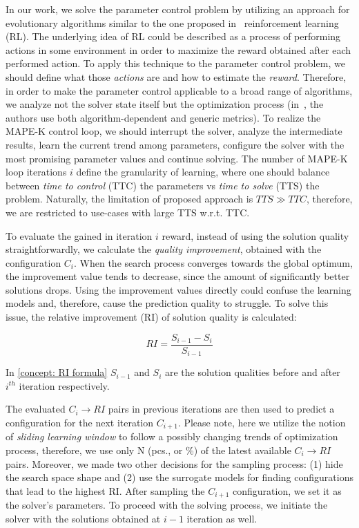 In our work, we solve the parameter control problem by utilizing an approach for evolutionary algorithms similar to the one proposed in~\cite{karafotias2014generic} reinforcement learning (RL). The underlying idea of RL could be described as a process of performing actions in some environment in order to maximize the reward obtained after each performed action. To apply this technique to the parameter control problem, we should define what those \emph{actions} are and how to estimate the \emph{reward}. Therefore, in order to make the parameter control applicable to a broad range of algorithms, we analyze not the solver state itself but the optimization process (in~\cite{karafotias2014generic}, the authors use both algorithm-dependent and generic metrics). To realize the MAPE-K control loop, we should interrupt the solver, analyze the intermediate results, learn the current trend among parameters, configure the solver with the most promising parameter values and continue solving. The number of MAPE-K loop iterations $i$ define the granularity of learning, where one should balance between \emph{time to control} (TTC) the parameters vs \emph{time to solve} (TTS) the problem. Naturally, the limitation of proposed approach is $TTS \gg TTC$, therefore, we are restricted to use-cases with large TTS w.r.t. TTC.

To evaluate the gained in iteration $i$ reward, instead of using the solution quality straightforwardly, we calculate the \emph{quality improvement}, obtained with the configuration $C_i$. When the search process converges towards the global optimum, the improvement value tends to decrease, since the amount of significantly better solutions drops. Using the improvement values directly could confuse the learning models and, therefore, cause the prediction quality to struggle. To solve this issue, the relative improvement (RI) of solution quality is calculated: 

\begin{equation}
RI = \frac{S_{i-1} - S_{i}}{S_{i-1}}
\label{concept: RI formula}
\end{equation}

In \cref{concept: RI formula} $S_{i-1}$ and $S_i$ are the solution qualities before and after $i^{th}$ iteration respectively.

The evaluated $C_i \rightarrow RI$ pairs in previous iterations are then used to predict a configuration for the next iteration $C_{i+1}$. Please note, here we utilize the notion of \emph{sliding learning window} to follow a possibly changing trends of optimization process, therefore, we use only N (pcs., or \%) of the latest available $C_i \rightarrow RI$ pairs. Moreover, we made two other decisions for the sampling process: (1) hide the search space shape and (2) use the surrogate models for finding configurations that lead to the highest RI. After sampling the $C_{i+1}$ configuration, we set it as the solver's parameters. To proceed with the solving process, we initiate the solver with the solutions obtained at $i-1$ iteration as well.

